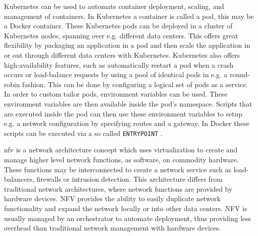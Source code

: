 Kubernetes \cite{kubernetes-website} can be used to automate container deployment, scaling, and management of containers. In Kubernetes a container is called a pod, this may be a Docker container. These Kubernetes pods can be deployed in a cluster of Kubernetes nodes, spanning over e.g. different data centers. This offers great flexibility by packaging an application in a pod and then scale the application in or out through different data centers with Kubernetes. Kubernetes also offers high-availability features, such as automatically restart a pod when a crash occurs or load-balance requests by using a pool of identical pods in e.g. a round-robin fashion. This can be done by configuring a logical set of pods as a service. In order to custom tailor pods, environment variables can be used. These environment variables are then available inside the pod's namespace. Scripts that are executed inside the pod can then use these environment variables to setup e.g. a network configuration by specifying routes and a gateway. In Docker these scripts can be executed via a so called \texttt{ENTRYPOINT} \cite{dockerfile-reference}.

\gls{nfv} is a network architecture concept which uses virtualization to create and manage higher level network functions, as software, on commodity hardware. These functions may be interconnected to create a network service such as load-balancers, firewalls or intrusion detection. This architecture differs from traditional network architectures, where network functions are provided by hardware devices. NFV provides the ability to easily duplicate network functionality and expand the network locally or into other data centers. NFV is usually managed by an orchestrator to automate deployment, thus providing less overhead than traditional network management with hardware devices.